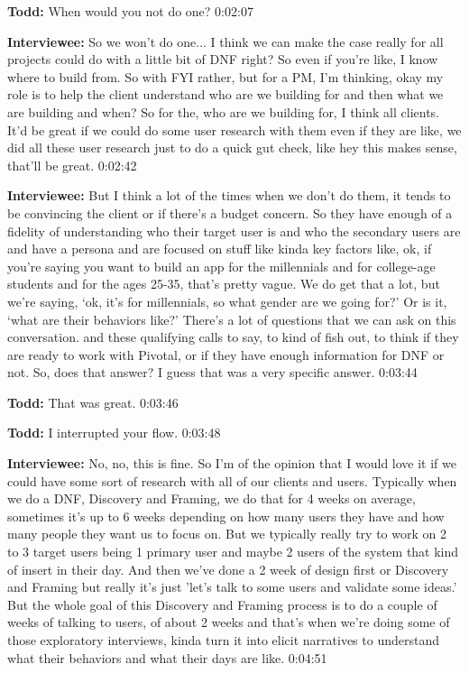 \textbf{Todd:} When would you not do one?  0:02:07

\textbf{Interviewee:} So we won't do one... I think we can make the case really for all projects could do with a little bit of DNF right? So even if you're like, I know where to build from. So with FYI rather, but for a PM, I'm thinking, okay my role is to help the client understand who are we building for and then what we are building and when? So for the, who are we building for, I think all clients.  It'd be great if we could do some user research with them even if they are like, we did all these user research just to do a quick gut check, like hey this makes sense, that'll be great.   0:02:42

\textbf{Interviewee:} But I think a lot of the times when we don't do them, it tends to be convincing the client or if there's a budget concern.  So they have enough of a fidelity of understanding who their target user is and who the secondary users are and have a persona and are focused on stuff like kinda key factors like, ok, if you're saying you want to build an app for the millennials and for college-age students and for the ages 25-35, that's pretty vague.  We do get that a lot, but we're saying, ‘ok, it's for millennials, so what gender are we going for?' Or is it, ‘what are their behaviors like?'  There's a lot of questions that we can ask on this conversation. and these qualifying calls to say, to kind of fish out, to think if they are ready to work with Pivotal, or if they have enough information for DNF or not. So, does that answer?  I guess that was a very specific answer.  0:03:44

\textbf{Todd:} That was great.  0:03:46

\textbf{Todd:} I interrupted your flow.  0:03:48

\textbf{Interviewee:} No, no, this is fine.  So I'm of the opinion that I would love it if we could have some sort of research with all of our clients and users. Typically when we do a DNF, Discovery and Framing, we do that for 4 weeks on average, sometimes it's up to 6 weeks depending on how many users they have and how many people they want us to focus on.  But we typically really try to work on 2 to 3 target users being 1 primary user and maybe 2 users of the system that kind of insert in their day.  And then we've done a 2 week of design first or Discovery and Framing but really it's just 'let's talk to some users and validate some ideas.' But the whole goal of this Discovery and Framing process is to do a couple of weeks of talking to users, of about 2 weeks and that's when we're doing some of those exploratory interviews, kinda turn it into elicit narratives to understand what their behaviors and what their days are like.   0:04:51

